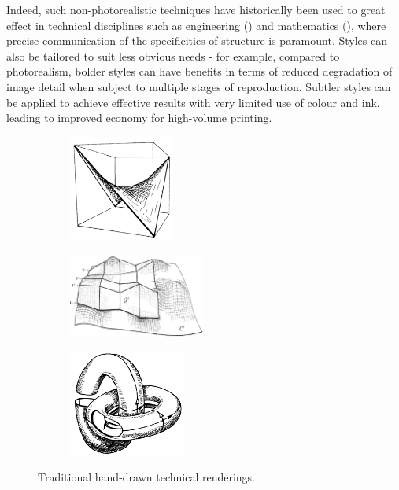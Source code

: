 Indeed, such non-photorealistic techniques have historically been used to great effect in technical disciplines such as engineering (\cite{porter1988}) and mathematics (\cite{francis2007}), where precise communication of the specificities of structure is paramount. Styles can also be tailored to suit less obvious needs - for example, compared to photorealism, bolder styles can have benefits in terms of reduced degradation of image detail when subject to multiple stages of reproduction. Subtler styles can be applied to achieve effective results with very limited use of colour and ink, leading to improved economy for high-volume printing.

\begin{figure}[h]
	\centering
	\begin{subfigure}[b]{0.3\textwidth}
		\includegraphics[height=3.5cm]{images/ex_hand_drawn1}
		\caption{}\label{ex_hand_drawn1}
	\end{subfigure}
	\begin{subfigure}[b]{0.3\textwidth}
		\includegraphics[width=4.5cm]{images/ex_hand_drawn2}
		\caption{}\label{ex_hand_drawn2}
	\end{subfigure}
	\begin{subfigure}[b]{0.3\textwidth}
		\includegraphics[height=3.5cm]{images/ex_hand_drawn3}
		\caption{}\label{ex_hand_drawn3}
	\end{subfigure}
	\caption{Traditional hand-drawn technical renderings.}
\end{figure}

